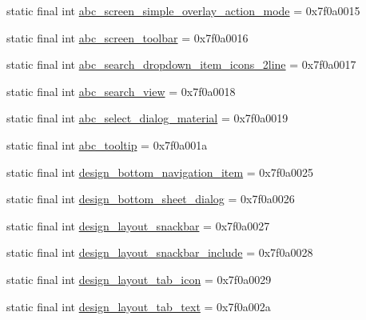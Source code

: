 \begin{DoxyCompactItemize}
\item 
static final int \mbox{\hyperlink{classandroid_1_1support_1_1design_1_1_r_1_1layout_a3098585a2f723080061fd42dd4d91d94}{abc\+\_\+screen\+\_\+simple\+\_\+overlay\+\_\+action\+\_\+mode}} = 0x7f0a0015
\item 
static final int \mbox{\hyperlink{classandroid_1_1support_1_1design_1_1_r_1_1layout_a27b17cd1e50e5101addd868ef7348ead}{abc\+\_\+screen\+\_\+toolbar}} = 0x7f0a0016
\item 
static final int \mbox{\hyperlink{classandroid_1_1support_1_1design_1_1_r_1_1layout_ac425206367179409e7f02a364f820c2f}{abc\+\_\+search\+\_\+dropdown\+\_\+item\+\_\+icons\+\_\+2line}} = 0x7f0a0017
\item 
static final int \mbox{\hyperlink{classandroid_1_1support_1_1design_1_1_r_1_1layout_aaddf023060f3d2bcf6aeaa8a47cba6da}{abc\+\_\+search\+\_\+view}} = 0x7f0a0018
\item 
static final int \mbox{\hyperlink{classandroid_1_1support_1_1design_1_1_r_1_1layout_a4138a3a5dbeee0c457208d182140fff7}{abc\+\_\+select\+\_\+dialog\+\_\+material}} = 0x7f0a0019
\item 
static final int \mbox{\hyperlink{classandroid_1_1support_1_1design_1_1_r_1_1layout_ad2cfe71c4ebbf9cc97c0d182461a9705}{abc\+\_\+tooltip}} = 0x7f0a001a
\item 
static final int \mbox{\hyperlink{classandroid_1_1support_1_1design_1_1_r_1_1layout_a92dd59bbbfd48a7d7ef64c8e52a1e34e}{design\+\_\+bottom\+\_\+navigation\+\_\+item}} = 0x7f0a0025
\item 
static final int \mbox{\hyperlink{classandroid_1_1support_1_1design_1_1_r_1_1layout_ab3671735991f403412ea91ffc3af61c1}{design\+\_\+bottom\+\_\+sheet\+\_\+dialog}} = 0x7f0a0026
\item 
static final int \mbox{\hyperlink{classandroid_1_1support_1_1design_1_1_r_1_1layout_a8d7f864b1731af8b70ca0654071ad76e}{design\+\_\+layout\+\_\+snackbar}} = 0x7f0a0027
\item 
static final int \mbox{\hyperlink{classandroid_1_1support_1_1design_1_1_r_1_1layout_a98d09e99d5eb781fb883b7b11df24dd6}{design\+\_\+layout\+\_\+snackbar\+\_\+include}} = 0x7f0a0028
\item 
static final int \mbox{\hyperlink{classandroid_1_1support_1_1design_1_1_r_1_1layout_a736d88071f77d19d86aa429d88c05d80}{design\+\_\+layout\+\_\+tab\+\_\+icon}} = 0x7f0a0029
\item 
static final int \mbox{\hyperlink{classandroid_1_1support_1_1design_1_1_r_1_1layout_a25a0ff3a8a0971cf70afd38cceec34ee}{design\+\_\+layout\+\_\+tab\+\_\+text}} = 0x7f0a002a

\end{DoxyCompactItemize}
